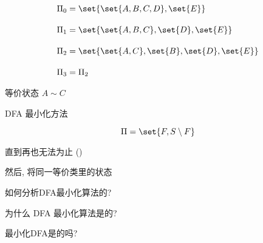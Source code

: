 \begin{frame}{}
  \begin{align*}
    \Pi_{0} &= \set{\set{A, B, C, D}, \set{E}} \\[10pt]
    \Pi_{1} &= \set{\set{A, B, C}, \set{D}, \set{E}} \\[10pt]
    \Pi_{2} &= \set{\set{A, C}, \set{B}, \set{D}, \set{E}} \\[10pt]
    \Pi_{3} &= \Pi_{2}
  \end{align*}
\end{frame}

\begin{frame}{}

  \begin{center}
    等价状态 $A \sim C$
  \end{center}


  \pause
  \begin{center}
  \end{center}
\end{frame}

\begin{frame}{}
  \begin{center}
    DFA 最小化方法
  \end{center}

  \[
    \Pi = \set{F, S \setminus F}
  \]


  \begin{center}
    直到再也无法为止 \quad ()

    \vspace{0.40cm}
    然后, 将同一等价类里的状态
  \end{center}
\end{frame}

\begin{frame}{}
  \begin{center}
    如何分析DFA最小化算法的?

    \pause
    \vspace{0.60cm}
    为什么 DFA 最小化算法是的?

    \pause
    \vspace{0.60cm}
    最小化DFA是的吗?

    \pause
    \vspace{0.30cm}
  \end{center}
\end{frame}

%
%
